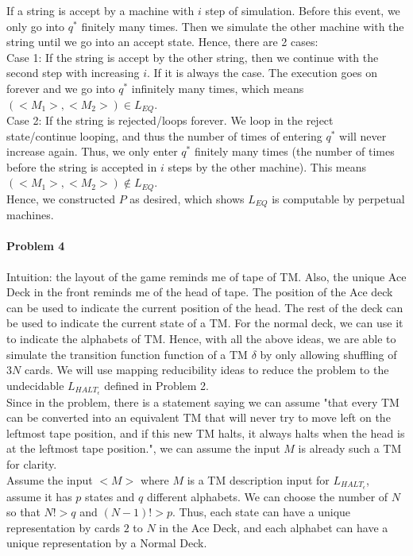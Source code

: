 \documentclass[11pt]{article}
\begin{document}
If a string is accept by a machine with $i$ step of simulation. Before this event, we only go into $q^*$ finitely many times. Then we simulate the other machine with the string until we go into an accept state. Hence, there are 2 cases:\\

Case 1: If the string is accept by the other string, then we continue with the second step with increasing $i$. If it is always the case. The execution goes on forever and we go into $q^*$ infinitely many times, which means $(<M_1>,<M_2>) \in L_{EQ}$.\\

Case 2: If the string is rejected/loops forever. We loop in the reject state/continue looping, and thus the number of times of entering $q^*$ will never increase again. Thus, we only enter $q^*$ finitely many times (the number of times before the string is accepted in $i$ steps by the other machine). This means  $(<M_1>,<M_2>) \not \in L_{EQ}$.\\

Hence, we constructed $P$ as desired, which shows $L_{EQ}$ is computable by perpetual machines.

\newpage
\paragraph{Problem 4}
Intuition: the layout of the game reminds me of tape of TM. Also, the unique Ace Deck in the front reminds me of the head of tape. The position of the Ace deck can be used to indicate the current position of the head. The rest of the deck can be used to indicate the current state of a TM. For the normal deck, we can use it to indicate the alphabets of TM. Hence, with all the above ideas, we are able to simulate the transition function function of a TM $\delta$ by only allowing shuffling of $3N$ cards. We will use mapping reducibility ideas to reduce the problem to the undecidable $L_{{HALT}_{\epsilon}}$ defined in Problem 2. \\

Since in the problem, there is a statement saying we can assume "that every TM can be converted into an equivalent TM that will never try to move left on the leftmost tape position, and if this new TM halts, it always halts when the head is at the leftmost tape position.", we can assume the input $M$ is already such a TM for clarity.\\

Assume the input $<M>$ where $M$ is a TM description input for $L_{{HALT}_{\epsilon}}$, assume it has $p$ states and $q$ different alphabets. We can choose the number of $N$ so that $N! > q$ and $(N-1)! > p$. Thus, each state can have a unique representation by cards $2$ to $N$ in the Ace Deck, and each alphabet can have a unique representation by a Normal Deck.\\
\end{document}
